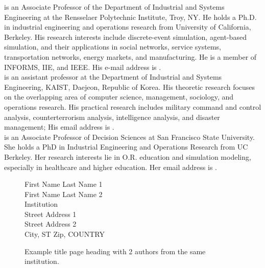 \documentclass{wscpaperproc}
\theoremstyle{wsc}
\begin{document}
 is an Associate Professor of the Department of Industrial and Systems Engineering at the Rensselaer Polytechnic Institute, Troy, NY.  He holds a Ph.D. in industrial engineering and operations research from University of California, Berkeley. His research interests include discrete-event simulation, agent-based simulation, and their applications in social networks, service systems, transportation networks, energy markets, and manufacturing. He is a member of INFORMS, IIE, and IEEE. His e-mail address is .\\

 is an assistant professor at the Department of Industrial and Systems Engineering, KAIST, Daejeon, Republic of Korea. His theoretic research focuses on the overlapping area of computer
science, management, sociology, and operations research. His practical research includes military command and control analysis, counterterrorism analysis, intelligence analysis, and disaster management; His email address is .\\

 is an Associate Professor of Decision Sciences at San Francisco State University. She holds a PhD in Industrial Engineering and Operations Research from UC Berkeley. Her research interests lie in O.R. education and simulation modeling, especially in healthcare and higher education. Her email address is .\\



\newpage

\begin{figure}[htb]
{
\centering
First Name Last Name 1 \\
First Name Last Name 2 \\
\vspace{12pt}
Institution \\
Street Address 1 \\
Street Address 2 \\
City, ST Zip, COUNTRY
\caption{Example title page heading with 2 authors from the same institution.\label{fig: 2 same}}
}
\end{figure}
\end{document}
